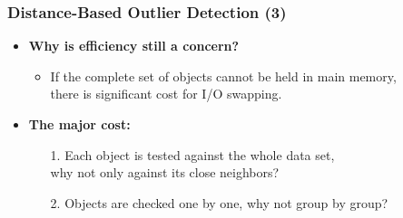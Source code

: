 \begin{frame}
	\frametitle{Distance-Based Outlier Detection (3)}
	\begin{itemize}
		\item \textbf{Why is efficiency still a concern?}
		      \begin{itemize}
			      \item If the complete set of objects cannot be held in main memory, \\
			            there is significant cost for I/O swapping.
		      \end{itemize}
		\item \textbf{The major cost:}
		      \begin{itemize}
			      \item[1.] Each object is tested against the whole data set, \\
				      why not only against its close neighbors?
			      \item[2.] Objects are checked one by one, why not group by group?
		      \end{itemize}
	\end{itemize}
\end{frame}


